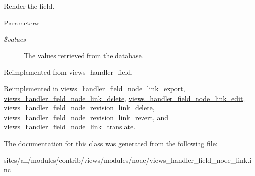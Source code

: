 Render the field.

\begin{Desc}
\item[Parameters:]
\begin{description}
\item[{\em \$values}]The values retrieved from the database. \end{description}
\end{Desc}


Reimplemented from \hyperlink{classviews__handler__field_82ff951c5e9ceb97b2eab86f880cbc1e}{views\_\-handler\_\-field}.

Reimplemented in \hyperlink{classviews__handler__field__node__link__export_84502b9c08a9b0fa22eb914b278d1a4f}{views\_\-handler\_\-field\_\-node\_\-link\_\-export}, \hyperlink{classviews__handler__field__node__link__delete_f0b922dd3c019c53247d0c30c83cfc99}{views\_\-handler\_\-field\_\-node\_\-link\_\-delete}, \hyperlink{classviews__handler__field__node__link__edit_86877ed929d2fcb0b8204c0907cf5b5c}{views\_\-handler\_\-field\_\-node\_\-link\_\-edit}, \hyperlink{classviews__handler__field__node__revision__link__delete_366322147e080ffbfc7f427d2a522362}{views\_\-handler\_\-field\_\-node\_\-revision\_\-link\_\-delete}, \hyperlink{classviews__handler__field__node__revision__link__revert_eb4c6a3ba1544e14492bd1fec4ee4e91}{views\_\-handler\_\-field\_\-node\_\-revision\_\-link\_\-revert}, and \hyperlink{classviews__handler__field__node__link__translate_887213a10a0090481e9001547cff8439}{views\_\-handler\_\-field\_\-node\_\-link\_\-translate}.

The documentation for this class was generated from the following file:\begin{CompactItemize}
\item 
sites/all/modules/contrib/views/modules/node/views\_\-handler\_\-field\_\-node\_\-link.inc\end{CompactItemize}
